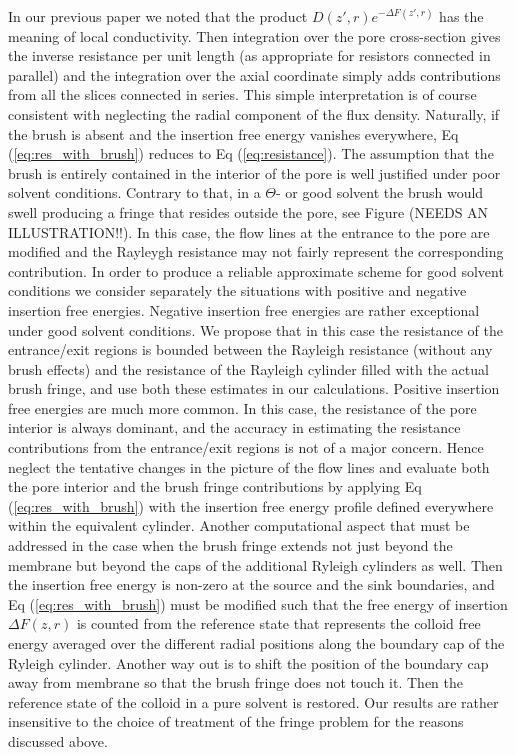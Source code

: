 In our previous paper we noted that the product $D(z',r)e^{-\Delta F(z',r)}$ has the meaning of local conductivity. Then integration over the pore cross-section gives the inverse resistance per unit length (as appropriate for resistors connected in parallel) and the integration over the axial coordinate simply adds contributions from all the slices connected in series. This simple interpretation is of course consistent with neglecting the radial component of the flux density. Naturally, if the brush is absent and the insertion free energy vanishes everywhere, Eq  (\ref{eq:res_with_brush}) reduces to Eq (\ref{eq:resistance}). 
The assumption that the brush is entirely contained in the interior of the pore is well justified under poor solvent conditions. Contrary to that, in a $\Theta$- or good solvent the brush would swell producing a fringe that resides outside the pore, see Figure (NEEDS AN ILLUSTRATION!!). In this case, the flow lines at the entrance to the pore are modified and the Rayleygh resistance may not fairly represent the corresponding contribution. 
In order to produce a reliable approximate scheme for good solvent conditions we consider separately the situations with positive and negative insertion free energies. Negative insertion free energies are rather exceptional under good solvent conditions. We propose that in this case  the resistance of the entrance/exit regions is bounded between the Rayleigh resistance (without any brush effects) and the resistance of the Rayleigh cylinder filled with the actual brush fringe, and use both these estimates in our calculations.
Positive insertion free energies are much more common. In this case, the resistance of the pore interior is always dominant, and the accuracy in estimating the resistance contributions from the entrance/exit regions is not of a major concern. Hence neglect the tentative changes in the picture of the flow lines and evaluate both the pore interior and the brush fringe contributions by applying  Eq (\ref{eq:res_with_brush}) with the insertion free energy profile defined everywhere within the equivalent cylinder.
Another computational aspect that must be addressed in the case when the brush fringe extends not just beyond the membrane but beyond the caps of the additional Ryleigh cylinders as well. Then the insertion free energy is non-zero at the source and the sink boundaries, and Eq (\ref{eq:res_with_brush}) must be modified such that the free energy of insertion $\Delta F(z,r)$ is counted from the reference state that represents the colloid free energy averaged over the different radial positions along the boundary cap of the Ryleigh cylinder. Another way out is to shift the position of the boundary cap away from membrane so that the brush fringe does not touch it. Then the reference state of the colloid in a pure solvent is restored. Our results are rather insensitive to the choice of treatment of the fringe problem for the reasons discussed above.

